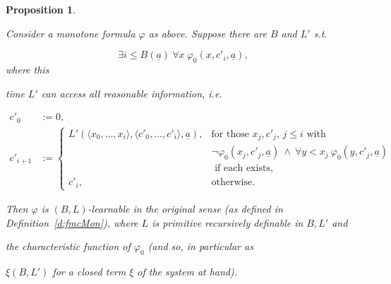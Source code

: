\documentclass[1p]{elsarticle}
\newcommand{\tup}{\underline} %
\newcommand{\Telse}{\text{otherwise}}
\theoremstyle{plain}
\newtheorem{prop}[thm]{Proposition}
\theoremstyle{definition}
\theoremstyle{remark}
\renewcommand{\phi}{\varphi}
\theoremstyle{definition}
\begin{document}
\begin{prop}\label{p:allx}

Consider a monotone formula $\phi$ as above. Suppose there are $B$ and $L'$ s.t.

\[ \exists i\leq B(\tup a)\ \forall x\ \phi_0(x,c'_i,\tup a),\] where this 

time $L'$ can access all reasonable information, i.e.

\begin{align*}

c'_0&:=0,\\

c'_{i+1}&:=

\begin{cases}

L'(\langle x_0,\ldots,x_i\rangle, \langle c'_0,\ldots,c'_i\rangle,\tup a), &\text{for those $x_j,c'_j$, $j\leq i$ with }\\

 &\neg\phi_0(x_j,c'_j,\tup a)\ \wedge\ \forall y<x_j\ \phi_0(y,c'_j,\tup a)\\

  &\text{ if each exists},\\

c'_i, &\Telse.

\end{cases}

\end{align*}

Then $\phi$ is $(B,L)$-learnable in the original sense (as defined in Definition~\ref{d:fmcMon}), where $L$ is primitive recursively definable in $B,L'$ and 

the characteristic function of $\varphi_0$ (and so, in particular as 

$\xi(B,L')$ for a closed term $\xi$ of the system at hand).

\end{prop}
\end{document}
